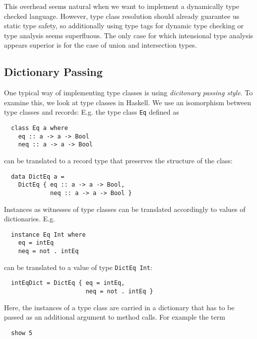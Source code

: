 This overhead seems natural when we want to implement a dynamically type checked language.
However, type class resolution should already guarantee us static type safety, so additionally using type tags for dynamic type checking or type analysis seems superfluous.
The only case for which intensional type analysis appears superior is for the case of union and intersection types.


\subsection{Dictionary Passing}
\label{sec:dictionaryPassing}

One typical way of implementing type classes is using \emph{dicitonary passing style}. \cite{kiselyov}
To examine this, we look at type classes in Haskell.
We use an isomorphism between type classes and records:
E.g. the type class \texttt{Eq} defined as

\begin{verbatim}
  class Eq a where
    eq :: a -> a -> Bool
    neq :: a -> a -> Bool
\end{verbatim}

can be translated to a record type that preserves the structure of the class:

\begin{verbatim}
  data DictEq a =
    DictEq { eq :: a -> a -> Bool,
             neq :: a -> a -> Bool }
\end{verbatim}

Instances as witnesses of type classes can be translated accordingly to values of dictionaries.
E.g.

\begin{verbatim}
  instance Eq Int where
    eq = intEq
    neq = not . intEq  
\end{verbatim}

can be translated to a value of type \texttt{DictEq Int}:

\begin{verbatim}
  intEqDict = DictEq { eq = intEq,
                       neq = not . intEq }
\end{verbatim}

Here, the instances of a type class are carried in a dictionary that has to be passed as an additional argument to method calls.
For example the term

\begin{verbatim}
  show 5
\end{verbatim}

